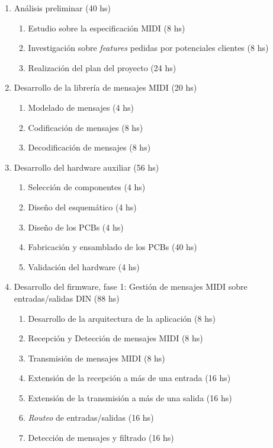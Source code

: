 \documentclass[
11pt, %
]{charter}
\begin{document}
\begin{enumerate}
	\item Análisis preliminar (40 hs)
	\begin{enumerate}
		\item Estudio sobre la especificación MIDI (8 hs)
		\item Investigación sobre \emph{features} pedidas por potenciales clientes (8 hs)
		\item Realización del plan del proyecto (24 hs)
	\end{enumerate}
	\item Desarrollo de la librería de mensajes MIDI (20 hs)
	\begin{enumerate}
		\item Modelado de mensajes (4 hs)
		\item Codificación de mensajes (8 hs)
		\item Decodificación de mensajes (8 hs)
	\end{enumerate}
	
	\item Desarrollo del hardware auxiliar (56 hs)
	\begin{enumerate}
		\item Selección de componentes (4 hs)
		\item Diseño del esquemático (4 hs)
		\item Diseño de los PCBs (4 hs)
		\item Fabricación y ensamblado de los PCBs (40 hs)
		\item Validación del hardware (4 hs)
	\end{enumerate}

	\item Desarrollo del firmware, fase 1: Gestión de mensajes MIDI sobre entradas/salidas DIN (88 hs)
	\begin{enumerate}
		\item Desarrollo de la arquitectura de la aplicación (8 hs)
		\item Recepción y Detección de mensajes MIDI (8 hs)
		\item Transmisión de mensajes MIDI (8 hs)
		\item Extensión de la recepción a más de una entrada (16 hs)
		\item Extensión de la transmisión a más de una salida (16 hs)
		\item \emph{Routeo} de entradas/salidas (16 hs)
		\item Detección de mensajes y filtrado (16 hs)
	\end{enumerate}
	

\end{enumerate}
\end{document}
